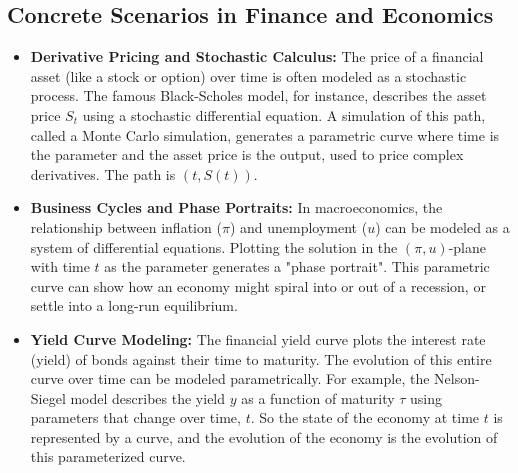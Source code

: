 \documentclass{article}
\begin{document}
\subsection{Concrete Scenarios in Finance and Economics}
\begin{itemize}
    \item \textbf{Derivative Pricing and Stochastic Calculus:} The price of a financial asset (like a stock or option) over time is often modeled as a stochastic process. The famous Black-Scholes model, for instance, describes the asset price \(S_t\) using a stochastic differential equation. A simulation of this path, called a Monte Carlo simulation, generates a parametric curve where time is the parameter and the asset price is the output, used to price complex derivatives. The path is \( (t, S(t)) \).
    \item \textbf{Business Cycles and Phase Portraits:} In macroeconomics, the relationship between inflation (\(\pi\)) and unemployment (\(u\)) can be modeled as a system of differential equations. Plotting the solution in the \((\pi, u)\)-plane with time \(t\) as the parameter generates a "phase portrait". This parametric curve can show how an economy might spiral into or out of a recession, or settle into a long-run equilibrium.
    \item \textbf{Yield Curve Modeling:} The financial yield curve plots the interest rate (yield) of bonds against their time to maturity. The evolution of this entire curve over time can be modeled parametrically. For example, the Nelson-Siegel model describes the yield \(y\) as a function of maturity \(\tau\) using parameters that change over time, \(t\). So the state of the economy at time \(t\) is represented by a curve, and the evolution of the economy is the evolution of this parameterized curve.
\end{itemize}
\end{document}
